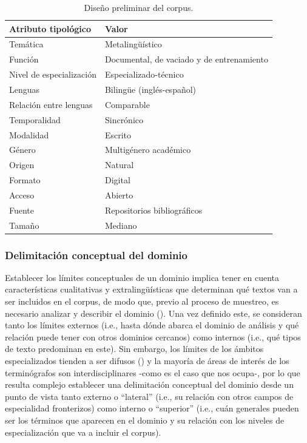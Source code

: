 \begin{table}[H]
\centering
\fontsize{12}{12}\selectfont
\begin{tabular}{@{}p{5cm}p{8cm}@{}}
\toprule
\textbf{Atributo tipológico} & \textbf{Valor} \\
\midrule
Temática & Metalingüístico \\
Función & {Documental, de vaciado y de entrenamiento} \\
Nivel de especialización & {Especializado-técnico} \\
Lenguas & {Bilingüe (inglés-español)} \\
Relación entre lenguas & {Comparable} \\
Temporalidad & {Sincrónico} \\
Modalidad & {Escrito} \\
Género & {Multigénero académico} \\
Origen & {Natural} \\
Formato & {Digital} \\
Acceso & {Abierto} \\
Fuente & {Repositorios bibliográficos} \\
Tamaño & {Mediano} \\
\bottomrule
\end{tabular}
\caption{Diseño preliminar del corpus.}
\label{tab:tipologia-corpus-simple}
\end{table}

\subsubsection{Delimitación conceptual del dominio}\label{subsec:conceptualization}

Establecer los límites conceptuales de un dominio implica tener en cuenta características cualitativas y extralingüísticas que determinan qué textos van a ser incluidos en el corpus, de modo que, previo al proceso de muestreo, es necesario analizar y describir el dominio (\cite{Egbert_Biber_Gray_2022}). Una vez definido este, se consideran tanto los límites externos (i.e., hasta dónde abarca el dominio de análisis y qué relación puede tener con otros dominios cercanos) como internos (i.e., qué tipos de texto predominan en este). Sin embargo, los límites de los ámbitos especializados tienden a ser difusos (\cite{meyer1996corpus}) y la mayoría de áreas de interés de los terminógrafos son interdisciplinares -como es el caso que nos ocupa-, por lo que resulta complejo establecer una delimitación conceptual del dominio desde un punto de vista tanto externo o ``lateral'' (i.e., su relación con otros campos de especialidad fronterizos) como interno o ``superior'' (i.e., cuán generales pueden ser los términos que aparecen en el dominio y su relación con los niveles de especialización que va a incluir el corpus).

